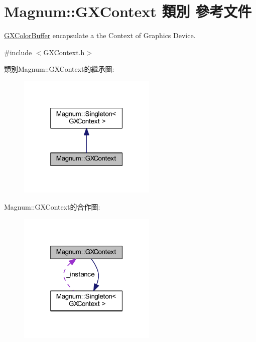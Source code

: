 \hypertarget{class_magnum_1_1_g_x_context}{}\section{Magnum\+:\+:G\+X\+Context 類別 參考文件}
\label{class_magnum_1_1_g_x_context}


\hyperlink{class_magnum_1_1_g_x_color_buffer}{G\+X\+Color\+Buffer} encapsulate a the Context of Graphics Device.  




{\ttfamily \#include $<$G\+X\+Context.\+h$>$}



類別\+Magnum\+:\+:G\+X\+Context的繼承圖\+:\nopagebreak
\begin{figure}[H]
\begin{center}
\leavevmode
\includegraphics[width=187pt]{class_magnum_1_1_g_x_context__inherit__graph}
\end{center}
\end{figure}


Magnum\+:\+:G\+X\+Context的合作圖\+:\nopagebreak
\begin{figure}[H]
\begin{center}
\leavevmode
\includegraphics[width=187pt]{class_magnum_1_1_g_x_context__coll__graph}
\end{center}
\end{figure}
